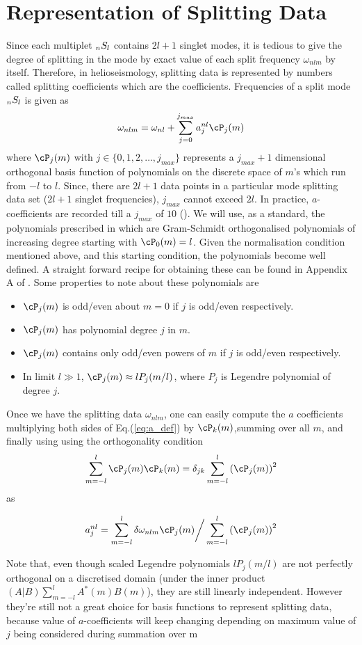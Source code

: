 \section{Representation of Splitting Data}
Since each multiplet $_{n}S_{l}$ contains $2l+1$ singlet modes, it is tedious to give the degree of splitting in the mode by exact value of each split frequency $\omega_{nlm}$ by itself. Therefore, in helioseismology, splitting data is represented by numbers called splitting coefficients which are the coefficients. Frequencies of a split mode $_{n}S_{l}$ is given as 
\begin{equation}
\omega_{nlm} = \omega_{nl} + \sum_{j=0}^{j_{max}} a^{nl}_j \cP_j(m)
\label{eq:a_def}
\end{equation}
where $\cP_{j}(m)$ with $j\in \{0,1,2,\ldots, j_{max}\}$ represents a $j_{max}+1$ dimensional orthogonal basis function of polynomials on the discrete space of $m$'s which run from $-l$ to $l$. Since, there are $2l+1$ data points in a particular mode splitting data set ($2l+1$ singlet frequencies), $j_{max}$ cannot exceed $2l$. In practice, $a$-coefficients are recorded till a $j_{max}$ of $10$ (\cite{schou_data}). We will use, as a standard, the polynomials prescribed in \cite{ritzwoller} which are Gram-Schmidt orthogonalised polynomials of increasing degree starting with $\cP_0(m) = l$. Given the normalisation condition mentioned above, and this starting condition, the polynomials become well defined. A straight forward recipe for obtaining these can be found in Appendix A of \cite{schou_pol_94}. Some properties to note about these polynomials are
\begin{itemize}
\item $\cP_j(m)$ is odd/even about $m=0$ if $j$ is odd/even respectively.
\item $\cP_j(m)$ has polynomial degree $j$ in $m$.
\item $\cP_j(m)$ contains only odd/even powers of $m$ if $j$ is odd/even respectively.
\item In limit $l \gg 1$, $\cP_j(m) \approx lP_{j}(m/l)$, where $P_j$ is Legendre polynomial of degree $j$.
\end{itemize}

Once we have the splitting data $\omega_{nlm}$, one can easily compute the $a$ coefficients multiplying both sides of Eq.(\ref{eq:a_def}) by $\cP_k(m)$,summing over all $m$, and finally using using the orthogonality condition $$\sum_{m=-l}^l \cP_{j}(m) \cP_{k}(m) = \delta_{jk} \sum_{m=-l}^l \enc{\cP_{j}(m)}^2$$
as

\begin{equation}
a^{nl}_j = \sum_{m=-l}^l \delta\omega_{nlm}\cP_j(m) \bigg/ \sum_{m=-l}^l \enc{\cP_j(m)}^2
\end{equation}


Note that, even though scaled Legendre polynomials $lP_j(m/l)$ are not perfectly orthogonal on a discretised domain (under the inner product $(A|B)\sum_{m=-l}^l A^*(m)B(m)$), they are still linearly independent. However they're still not a great choice for basis functions to represent splitting data, because value of $a$-coefficients will keep changing depending on maximum value of $j$ being considered during summation over m